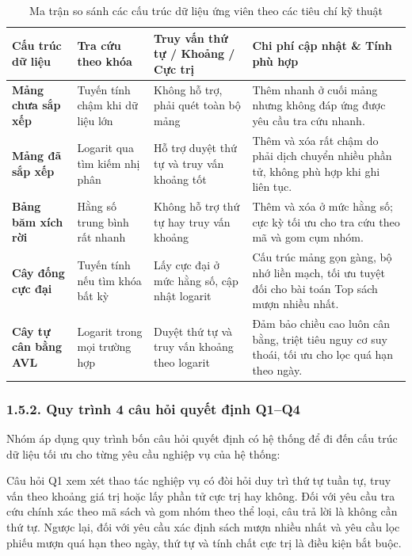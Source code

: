 \documentclass[14pt,a4paper]{extarticle}
\begin{document}
\begin{table}[H]
\centering
\begingroup
{}
\setlength{\tabcolsep}{4pt}
\renewcommand{\arraystretch}{1.15}
\begin{tabularx}{\linewidth}{|>{\raggedright\arraybackslash}m{2.6cm}|>{\raggedright\arraybackslash}m{2.5cm}|>{\raggedright\arraybackslash}m{3.2cm}|>{\raggedright\arraybackslash}X|}
\hline
\textbf{Cấu trúc dữ liệu} & \textbf{Tra cứu theo khóa} & \textbf{Truy vấn thứ tự / Khoảng / Cực trị} & \textbf{Chi phí cập nhật \& Tính phù hợp} \\ \hline
\textbf{Mảng chưa sắp xếp} & Tuyến tính chậm khi dữ liệu lớn & Không hỗ trợ, phải quét toàn bộ mảng & Thêm nhanh ở cuối mảng nhưng không đáp ứng được yêu cầu tra cứu nhanh. \\ \hline
\textbf{Mảng đã sắp xếp} & Logarit qua tìm kiếm nhị phân & Hỗ trợ duyệt thứ tự và truy vấn khoảng tốt & Thêm và xóa rất chậm do phải dịch chuyển nhiều phần tử, không phù hợp khi ghi liên tục. \\ \hline
\textbf{Bảng băm xích rời} & Hằng số trung bình rất nhanh & Không hỗ trợ thứ tự hay truy vấn khoảng & Thêm và xóa ở mức hằng số; cực kỳ tối ưu cho tra cứu theo mã và gom cụm nhóm. \\ \hline
\textbf{Cây đống cực đại} & Tuyến tính nếu tìm khóa bất kỳ & Lấy cực đại ở mức hằng số, cập nhật logarit & Cấu trúc mảng gọn gàng, bộ nhớ liền mạch, tối ưu tuyệt đối cho bài toán Top sách mượn nhiều nhất. \\ \hline
\textbf{Cây tự cân bằng AVL} & Logarit trong mọi trường hợp & Duyệt thứ tự và truy vấn khoảng theo logarit & Đảm bảo chiều cao luôn cân bằng, triệt tiêu nguy cơ suy thoái, tối ưu cho lọc quá hạn theo ngày. \\ \hline
\end{tabularx}
\endgroup
\caption{Ma trận so sánh các cấu trúc dữ liệu ứng viên theo các tiêu chí kỹ thuật}
\label{tab:dsa_comparison_matrix}
\end{table}

\subsubsection*{1.5.2. Quy trình 4 câu hỏi quyết định Q1--Q4}

Nhóm áp dụng quy trình bốn câu hỏi quyết định có hệ thống để đi đến cấu trúc dữ liệu tối ưu cho từng yêu cầu nghiệp vụ của hệ thống:

Câu hỏi Q1 xem xét thao tác nghiệp vụ có đòi hỏi duy trì thứ tự tuần tự, truy vấn theo khoảng giá trị hoặc lấy phần tử cực trị hay không. Đối với yêu cầu tra cứu chính xác theo mã sách và gom nhóm theo thể loại, câu trả lời là không cần thứ tự. Ngược lại, đối với yêu cầu xác định sách mượn nhiều nhất và yêu cầu lọc phiếu mượn quá hạn theo ngày, thứ tự và tính chất cực trị là điều kiện bắt buộc.
\end{document}
